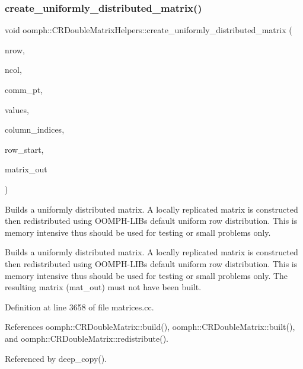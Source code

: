 \subsubsection{\texorpdfstring{create\+\_\+uniformly\+\_\+distributed\+\_\+matrix()}{create\_uniformly\_distributed\_matrix()}}
{\footnotesize\ttfamily void oomph\+::\+C\+R\+Double\+Matrix\+Helpers\+::create\+\_\+uniformly\+\_\+distributed\+\_\+matrix (\begin{DoxyParamCaption}\item[{const unsigned \&}]{nrow,  }\item[{const unsigned \&}]{ncol,  }\item[{const \hyperlink{classoomph_1_1OomphCommunicator}{Oomph\+Communicator} $\ast$const}]{comm\+\_\+pt,  }\item[{const \hyperlink{classoomph_1_1Vector}{Vector}$<$ double $>$ \&}]{values,  }\item[{const \hyperlink{classoomph_1_1Vector}{Vector}$<$ int $>$ \&}]{column\+\_\+indices,  }\item[{const \hyperlink{classoomph_1_1Vector}{Vector}$<$ int $>$ \&}]{row\+\_\+start,  }\item[{\hyperlink{classoomph_1_1CRDoubleMatrix}{C\+R\+Double\+Matrix} \&}]{matrix\+\_\+out }\end{DoxyParamCaption})}



Builds a uniformly distributed matrix. A locally replicated matrix is constructed then redistributed using O\+O\+M\+P\+H-\/\+L\+IB\textquotesingle{}s default uniform row distribution. This is memory intensive thus should be used for testing or small problems only. 

Builds a uniformly distributed matrix. A locally replicated matrix is constructed then redistributed using O\+O\+M\+P\+H-\/\+L\+IB\textquotesingle{}s default uniform row distribution. This is memory intensive thus should be used for testing or small problems only. The resulting matrix (mat\+\_\+out) must not have been built. 

Definition at line 3658 of file matrices.\+cc.



References oomph\+::\+C\+R\+Double\+Matrix\+::build(), oomph\+::\+C\+R\+Double\+Matrix\+::built(), and oomph\+::\+C\+R\+Double\+Matrix\+::redistribute().



Referenced by deep\+\_\+copy().

\mbox{\label{namespaceoomph_1_1CRDoubleMatrixHelpers_a157511f700993ab8bc014f9d0d44f4c7}} 
